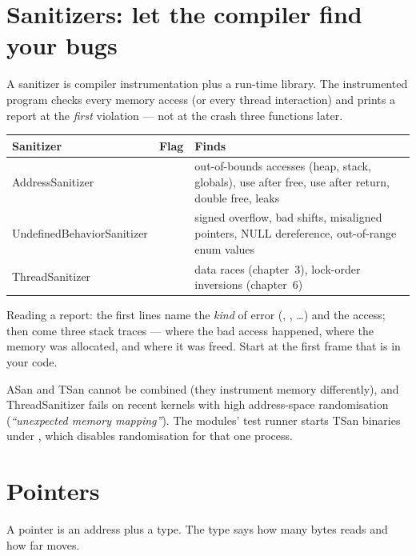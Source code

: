 \section{Sanitizers: let the compiler find your bugs}

A sanitizer is compiler instrumentation plus a run-time library. The
instrumented program checks every memory access (or every thread
interaction) and prints a report at the \emph{first} violation --- not at
the crash three functions later.

\begin{center}
\begin{tabular}{L{3.3cm}L{4.4cm}L{6.1cm}}
\toprule
\textbf{Sanitizer} & \textbf{Flag} & \textbf{Finds} \\
\midrule
AddressSanitizer &  & out-of-bounds accesses (heap,
stack, globals), use after free, use after return, double free, leaks \\
Undefined\-Behavior\-Sanitizer &  & signed overflow,
bad shifts, misaligned pointers, NULL dereference, out-of-range enum values \\
ThreadSanitizer &  & data races (chapter~3),
lock-order inversions (chapter~6) \\
\bottomrule
\end{tabular}
\end{center}

Reading a report: the first lines name the \emph{kind} of error
(, , \dots) and the
access; then come three stack traces --- where the bad access happened,
where the memory was allocated, and where it was freed. Start at the
first frame that is in your code.

\begin{warnbox}
ASan and TSan cannot be combined (they instrument memory differently),
and ThreadSanitizer fails on recent kernels with high address-space
randomisation (\emph{``unexpected memory mapping''}). The modules' test
runner starts TSan binaries under , which disables
randomisation for that one process.
\end{warnbox}

\section{Pointers}

A pointer is an address plus a type. The type says how many bytes
 reads and how far  moves.

